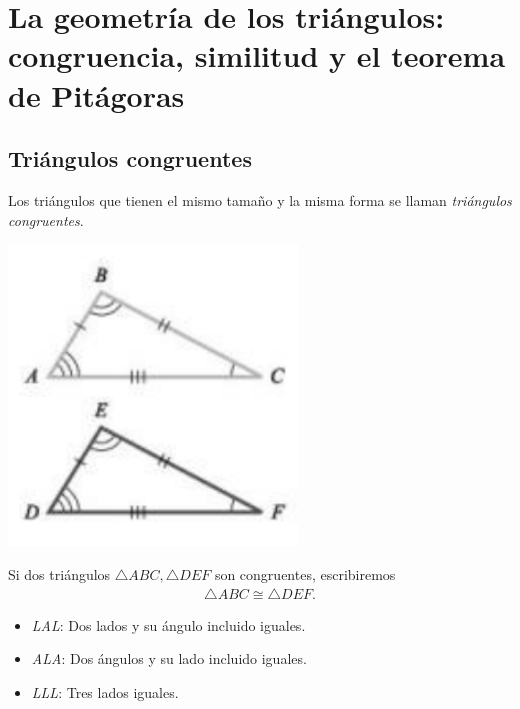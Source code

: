 

\section{La geometría de los triángulos: congruencia, similitud y el teorema de Pitágoras}

\subsection{Triángulos congruentes}

{}
	Los triángulos que tienen el mismo tamaño y la misma forma se llaman \emph{triángulos congruentes}.

{}
	\begin{center}
		\includegraphics[height=8cm,keepaspectratio=true]{./trig/algsup3-01.png}
	\end{center}
	

{}
	Si dos triángulos $\triangle ABC, \triangle DEF$ son congruentes, escribiremos \begin{align*}
		\triangle ABC \cong \triangle DEF.
	\end{align*}

{}
	\begin{proposicion}
		\begin{itemize}
			\item \emph{LAL}: Dos lados y su ángulo incluido iguales.
			\item \emph{ALA}: Dos ángulos y su lado incluido iguales. 
			\item \emph{LLL}: Tres lados iguales. 
		\end{itemize}
		
	\end{proposicion}
	


